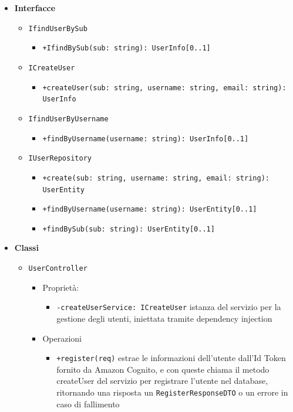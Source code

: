 \documentclass[a4paper, 11pt]{article}
\newcounter{subsubsubsection}[subsubsection]
\newcounter{subsubsubsubsection}[subsubsubsection]
\begin{document}
\begin{itemize}
	\item \textbf{Interfacce}
		\begin{itemize}
			\item \texttt{IfindUserBySub}
				\begin{itemize}
					\item \texttt{+IfindBySub(sub: string): UserInfo[0..1]}
				\end{itemize}
			\item \texttt{ICreateUser}
				\begin{itemize}
					\item \texttt{+createUser(sub: string, username: string, email: string): UserInfo}
				\end{itemize}
			\item \texttt{IfindUserByUsername}
				\begin{itemize}
					\item \texttt{+findByUsername(username: string): UserInfo[0..1]}
				\end{itemize}
			\item \texttt{IUserRepository}
				\begin{itemize}
					\item \texttt{+create(sub: string, username: string, email: string): UserEntity}
					\item \texttt{+findByUsername(username: string): UserEntity[0..1]}
					\item \texttt{+findBySub(sub: string): UserEntity[0..1]}
				\end{itemize}
		\end{itemize}
	\item \textbf{Classi}
		\begin{itemize}
			\item \texttt{UserController}
				\begin{itemize}
					\item Proprietà:
						\begin{itemize}
							\item \texttt{-createUserService: ICreateUser} istanza del servizio per la gestione degli utenti, iniettata tramite dependency injection
						\end{itemize}
					\item Operazioni
						\begin{itemize}
							\item \texttt{+register(req)} estrae le informazioni dell'utente dall'Id Token fornito da Amazon Cognito, e con queste chiama il metodo createUser del servizio per registrare l'utente nel database, ritornando una risposta un \texttt{RegisterResponseDTO} o un errore in caso di fallimento
						\end{itemize}
				\end{itemize}


\end{itemize}
\end{itemize}
\end{document}
